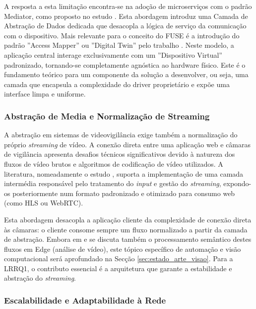 A resposta a esta limitação encontra-se na adoção de microserviços com o padrão Mediator, como proposto no estudo \cite{dobaj_microservice_2018}. Esta abordagem introduz uma Camada de Abstração de Dados dedicada que desacopla a lógica de serviço da comunicação com o dispositivo. Mais relevante para o conceito do \gls{FUSE} é a introdução do padrão ''Access Mapper'' ou ''Digital Twin'' pelo trabalho \cite{mafamane_study_2021}. Neste modelo, a aplicação central interage exclusivamente com um ''Dispositivo Virtual'' padronizado, tornando-se completamente agnóstica ao hardware físico. Este é o fundamento teórico para um componente da solução a desenvolver, ou seja, uma camada que encapsula a complexidade do driver proprietário e expõe uma interface limpa e uniforme.

\subsubsection{Abstração de Media e Normalização de Streaming}

A abstração em sistemas de videovigilância exige também a normalização do próprio \textit{streaming} de vídeo. A conexão direta entre uma aplicação web e câmaras de vigilância apresenta desafios técnicos significativos devido à natureza dos fluxos de vídeo brutos e algoritmos de codificação de vídeo utilizados. A literatura, nomeadamente o estudo \cite{schwarzer_ial_2021}, suporta a implementação de uma camada intermédia responsável pelo tratamento do \textit{input} e gestão do \textit{streaming}, expondo-os posteriormente num formato padronizado e otimizado para consumo web (como \gls{HLS} ou \gls{WebRTC}).

Esta abordagem desacopla a aplicação cliente da complexidade de conexão direta às câmaras: o cliente consome sempre um fluxo normalizado a partir da camada de abstração. Embora em \cite{schwarzer_ial_2021} e \cite{barra_exploring_2024} se discuta também o processamento semântico destes fluxos em Edge (análise de vídeo), este tópico específico de automação e visão computacional será aprofundado na Secção \ref{sec:estado_arte_visao}. Para a LRRQ1, o contributo essencial é a arquitetura que garante a estabilidade e abstração do \textit{streaming}.

\subsubsection{Escalabilidade e Adaptabilidade à Rede}

